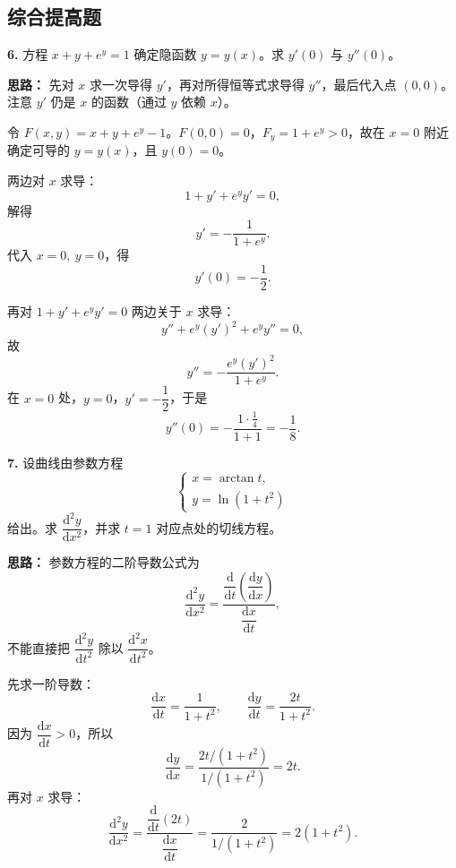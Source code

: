 \else \answerarea[8] \fi%

\subsection{综合提高题}

\textbf{6.} 方程 $x+y+e^y=1$ 确定隐函数 $y=y(x)$。求 $y'(0)$ 与 $y''(0)$。

\ifshowsolutions%

\textbf{思路：} 先对 $x$ 求一次导得 $y'$，再对所得恒等式求导得 $y''$，最后代入点 $(0,0)$。注意 $y'$ 仍是 $x$ 的函数（通过 $y$ 依赖 $x$）。

令 $F(x,y)=x+y+e^y-1$。$F(0,0)=0$，$F_y=1+e^y>0$，故在 $x=0$ 附近确定可导的 $y=y(x)$，且 $y(0)=0$。

两边对 $x$ 求导：
\[
1+y'+e^y y'=0,
\]
解得
\[
y'=-\frac{1}{1+e^y}.
\]
代入 $x=0,\ y=0$，得
\[
y'(0)=-\frac{1}{2}.
\]

再对 $1+y'+e^yy'=0$ 两边关于 $x$ 求导：
\[
y''+e^y(y')^2+e^yy''=0,
\]
故
\[
y''=-\frac{e^y(y')^2}{1+e^y}.
\]
在 $x=0$ 处，$y=0$，$y'=-\dfrac12$，于是
\[
y''(0)=-\frac{1\cdot\frac14}{1+1}=-\frac18.
\]

\else \answerarea[8] \fi%

\textbf{7.} 设曲线由参数方程
\[
\begin{cases}
x=\arctan t,\\
y=\ln(1+t^2)
\end{cases}
\]
给出。求 $\dfrac{\mathrm{d}^2y}{\mathrm{d}x^2}$，并求 $t=1$ 对应点处的切线方程。

\ifshowsolutions%

\textbf{思路：} 参数方程的二阶导数公式为
\[
\frac{\mathrm{d}^2y}{\mathrm{d}x^2}
=\frac{\dfrac{\mathrm{d}}{\mathrm{d}t}\left(\dfrac{\mathrm{d}y}{\mathrm{d}x}\right)}{\dfrac{\mathrm{d}x}{\mathrm{d}t}},
\]
不能直接把 $\dfrac{\mathrm{d}^2y}{\mathrm{d}t^2}$ 除以 $\dfrac{\mathrm{d}^2x}{\mathrm{d}t^2}$。

先求一阶导数：
\[
\frac{\mathrm{d}x}{\mathrm{d}t}=\frac{1}{1+t^2},\qquad
\frac{\mathrm{d}y}{\mathrm{d}t}=\frac{2t}{1+t^2}.
\]
因为 $\dfrac{\mathrm{d}x}{\mathrm{d}t}>0$，所以
\[
\frac{\mathrm{d}y}{\mathrm{d}x}
=\frac{2t/(1+t^2)}{1/(1+t^2)}=2t.
\]
再对 $x$ 求导：
\[
\frac{\mathrm{d}^2y}{\mathrm{d}x^2}
=\frac{\dfrac{\mathrm{d}}{\mathrm{d}t}(2t)}{\dfrac{\mathrm{d}x}{\mathrm{d}t}}
=\frac{2}{1/(1+t^2)}=2(1+t^2).
\]

